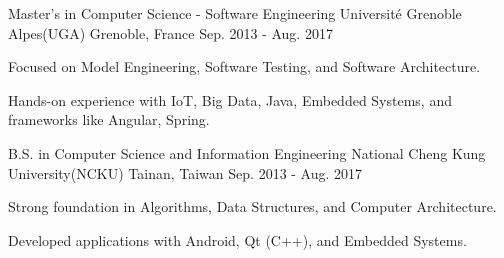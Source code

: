 

\begin{cventries}

  \cventry
    {Master's in Computer Science - Software Engineering} %
    {Université Grenoble Alpes(UGA)} %
    {Grenoble, France} %
    {Sep. 2013 - Aug. 2017} %
    {
      \begin{cvitems} %
        \item {Focused on Model Engineering, Software Testing, and Software Architecture.}
        \item {Hands-on experience with IoT, Big Data, Java, Embedded Systems, and frameworks like Angular, Spring.}
      \end{cvitems}
    }

  \cventry
    {B.S. in Computer Science and Information Engineering} %
    {National Cheng Kung University(NCKU)} %
    {Tainan, Taiwan} %
    {Sep. 2013 - Aug. 2017} %
    {
      \begin{cvitems} %
        \item {Strong foundation in Algorithms, Data Structures, and Computer Architecture.}
        \item {Developed applications with Android, Qt (C++), and Embedded Systems.}
      \end{cvitems}
    }

\end{cventries}
